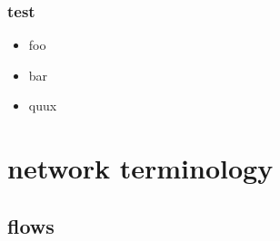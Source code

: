\documentclass{mytalk2}
\begin{document}
\begin{frame}
\end{frame}

\begin{frame}\frametitle{test}
    \begin{itemize}
        \item foo
        \item bar
        \item quux
    \end{itemize}
\end{frame}

\section{network terminology}


%

\subsection{flows}




%
\end{document}
